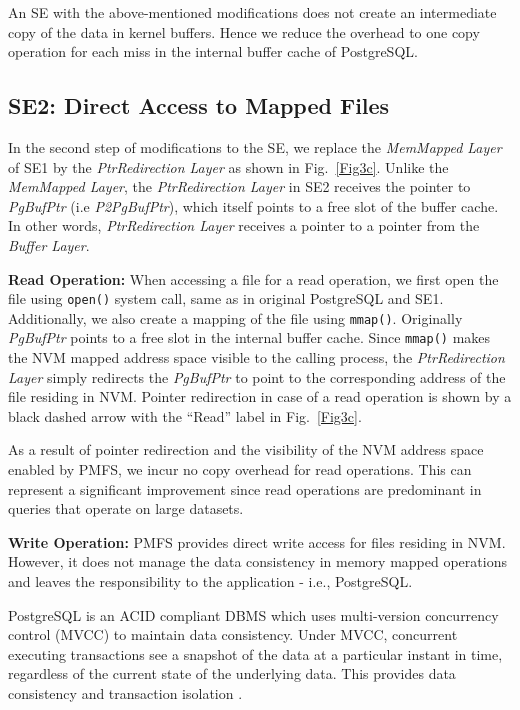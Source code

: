 An SE with the above-mentioned modifications does not create an intermediate copy of the data in kernel buffers. Hence 
we reduce the overhead to one copy operation for each miss in the internal buffer cache of PostgreSQL. 

\subsection{SE2: Direct Access to Mapped Files}
In the second step of modifications to the SE, we replace the \textit{MemMapped Layer} of SE1 by 
the \textit{PtrRedirection Layer} as shown in Fig.~\ref{Fig3c}. Unlike the \textit{MemMapped Layer}, 
the \textit{PtrRedirection Layer} in SE2 receives the pointer to \textit{PgBufPtr} (i.e \textit{P2PgBufPtr}), which itself points to a free slot of the buffer cache. In other words, \textit{PtrRedirection Layer} receives a pointer to a pointer from the \textit{Buffer Layer}.

\noindent\textbf{Read Operation:} When accessing a file for a read operation, we first open the file using \verb+open()+ system call, same as in original PostgreSQL and SE1. Additionally, we also create a mapping of the file using \verb+mmap()+. Originally \textit{PgBufPtr} points to a free slot in the 
internal buffer cache. Since \verb+mmap()+ makes the NVM mapped address space visible to the calling process, the \textit{PtrRedirection Layer} simply redirects the \textit{PgBufPtr} to point to the corresponding address of the file residing in NVM. Pointer redirection in case of a read operation is shown by a black dashed arrow with the ``Read'' label in Fig.~\ref{Fig3c}.

As a result of pointer redirection and the visibility of the NVM address space enabled by PMFS, we incur no copy 
overhead for read operations. This can represent a significant improvement since read operations are predominant in queries that operate on large datasets.

\noindent\textbf{Write Operation:} PMFS provides direct write access for files residing in NVM. 
However, it does not manage the data consistency in memory mapped operations and leaves the responsibility 
to the application \cite{dulloor2014system} - i.e., PostgreSQL.


PostgreSQL is an ACID compliant DBMS which uses 
multi-version concurrency control (MVCC) \cite{neumann2015fast}
to maintain data consistency.
Under MVCC, concurrent executing transactions see a snapshot of the data at a particular instant in time, 
regardless of the current state of the underlying data. This provides data consistency and transaction isolation \cite{PostgreSQLDocBook}. 

